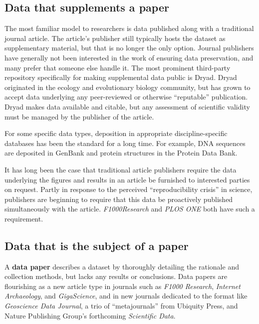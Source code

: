 \documentclass[10pt,a4paper,twocolumn]{article}
\begin{document}
\subsection*{Data that supplements a paper}\label{paper-supplement-data}

The most familiar model to researchers is data published along with a traditional journal article. 
The article's publisher still typically hosts the dataset as supplementary material, but that is no longer the only option.
Journal publishers have generally not been interested in the work of ensuring data preservation, and many prefer that someone else handle it.
The most prominent third-party repository specifically for making supplemental data public is Dryad\cite{dryad}.
Dryad originated in the ecology and evolutionary biology community, but has grown to accept data underlying any peer-reviewed or otherwise ``reputable'' publication. Dryad makes data available and citable, but any assessment of scientific validity must be managed by the publisher of the article. 

For some specific data types, deposition in appropriate discipline-specific databases has been the standard for a long time. 
For example, DNA sequences are deposited in GenBank\cite{genbank} and protein structures in the Protein Data Bank\cite{protein_data_bank}.

It has long been the case that traditional article publishers require the data underlying the figures and results in an article be furnished to interested parties on request.
Partly in response to the perceived ``reproducibility crisis'' in science, publishers are beginning to require that this data be proactively published simultaneously with the article.  
\emph{F1000Research} and \emph{PLOS ONE} both have such a requirement.





\subsection*{Data that is the subject of a paper}\label{paper-subject-data}

A \textbf{data paper} describes a dataset by thoroughly detailing the rationale and collection methods, but lacks any results or conclusions. 
Data papers are flourishing as a new article type in journals such as \emph{F1000 Research}\cite{f1000_research}, \emph{Internet Archaeology}\cite{internet_archaeology}, and \emph{GigaScience}\cite{gigascience}, and in new journals dedicated to the format like \emph{Geoscience Data Journal}\cite{geoscience_data_journal}, a trio of ``metajournals'' from Ubiquity Press\cite{ubiquity_press_metajournals}, and Nature Publishing Group's forthcoming \emph{Scientific Data}\cite{nature_scientific_data}.
\end{document}
